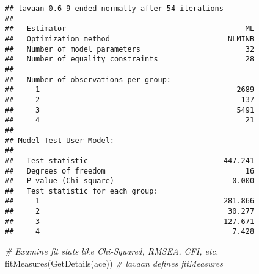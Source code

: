 \documentclass[smallextended]{svjour3}       %
\newenvironment{Shaded}{\begin{snugshade}}{\end{snugshade}}
\newcommand{\CommentTok}[1]{\textcolor[rgb]{0.56,0.35,0.01}{\textit{#1}}}
\newcommand{\FunctionTok}[1]{\textcolor[rgb]{0.00,0.00,0.00}{#1}}
\newcommand{\NormalTok}[1]{#1}
\begin{document}
\begin{verbatim}
## lavaan 0.6-9 ended normally after 54 iterations
## 
##   Estimator                                         ML
##   Optimization method                           NLMINB
##   Number of model parameters                        32
##   Number of equality constraints                    28
##                                                       
##   Number of observations per group:                   
##     1                                             2689
##     2                                              137
##     3                                             5491
##     4                                               21
##                                                       
## Model Test User Model:
##                                                       
##   Test statistic                               447.241
##   Degrees of freedom                                16
##   P-value (Chi-square)                           0.000
##   Test statistic for each group:
##     1                                          281.866
##     2                                           30.277
##     3                                          127.671
##     4                                            7.428
\end{verbatim}

\begin{Shaded}
\begin{Highlighting}[]
\CommentTok{\# Examine fit stats like Chi{-}Squared, RMSEA, CFI, etc.}
\FunctionTok{fitMeasures}\NormalTok{(}\FunctionTok{GetDetails}\NormalTok{(ace)) }\CommentTok{\# lavaan defines fitMeasures}
\end{Highlighting}
\end{Shaded}
\end{document}
